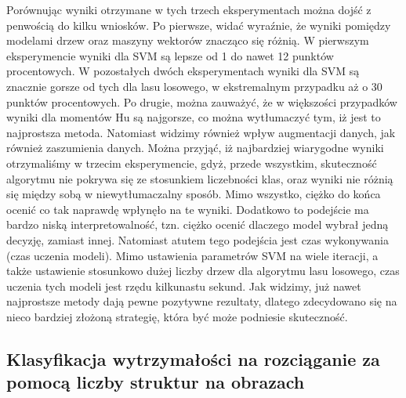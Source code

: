 Porównując wyniki otrzymane w tych trzech eksperymentach można dojść z penwością do kilku wniosków. Po pierwsze, widać wyraźnie, że wyniki pomiędzy modelami drzew oraz maszyny wektorów znacząco się różnią. W pierwszym eksperymencie wyniki dla SVM są lepsze od 1 do nawet 12 punktów procentowych. W pozostałych dwóch eksperymentach wyniki dla SVM są znacznie gorsze od tych dla lasu losowego, w ekstremalnym przypadku aż o 30 punktów procentowych. Po drugie, można zauważyć, że w większości przypadków wyniki dla momentów Hu są najgorsze, co można wytłumaczyć tym, iż jest to najprostsza metoda. Natomiast widzimy również wpływ augmentacji danych, jak również zaszumienia danych. Można przyjąć, iż najbardziej wiarygodne wyniki otrzymaliśmy w trzecim eksperymencie, gdyż, przede wszystkim, skuteczność algorytmu nie pokrywa się ze stosunkiem liczebności klas, oraz wyniki nie różnią się między sobą w niewytłumaczalny sposób. Mimo wszystko, ciężko do końca ocenić co tak naprawdę wpłynęło na te wyniki. Dodatkowo to podejście ma bardzo niską interpretowalność, tzn. ciężko ocenić dlaczego model wybrał jedną decyzję, zamiast innej. Natomiast atutem tego podejścia jest czas wykonywania (czas uczenia modeli). Mimo ustawienia parametrów SVM na wiele iteracji, a także ustawienie stosunkowo dużej liczby drzew dla algorytmu lasu losowego, czas uczenia tych modeli jest rzędu kilkunastu sekund. Jak widzimy, już nawet najprostsze metody dają pewne pozytywne rezultaty, dlatego zdecydowano się na nieco bardziej złożoną strategię, która być może podniesie skuteczność.

\subsection{Klasyfikacja wytrzymałości na rozciąganie za pomocą liczby struktur na obrazach}
\label{Klasyfikacja za pomocą liczby struktur}

